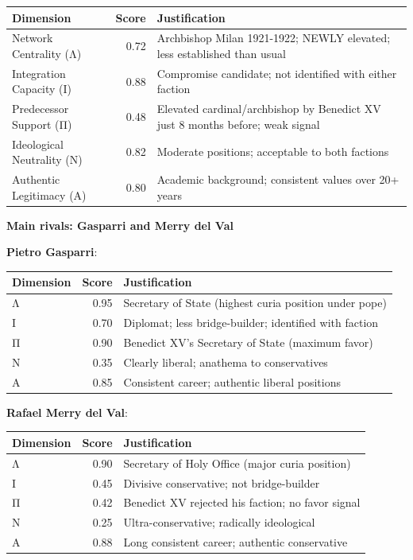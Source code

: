 \documentclass[11pt,a4paper]{article}
\begin{document}
\begin{center}
\begin{tabular}{lrp{4cm}}
\toprule
\textbf{Dimension} & \textbf{Score} & \textbf{Justification} \\
\midrule
Network Centrality (Λ) & 0.72 & Archbishop Milan 1921-1922; NEWLY elevated; less established than usual \\
Integration Capacity (Ι) & 0.88 & Compromise candidate; not identified with either faction \\
Predecessor Support (Π) & 0.48 & Elevated cardinal/archbishop by Benedict XV just 8 months before; weak signal \\
Ideological Neutrality (Ν) & 0.82 & Moderate positions; acceptable to both factions \\
Authentic Legitimacy (Α) & 0.80 & Academic background; consistent values over 20+ years \\
\bottomrule
\end{tabular}
\end{center}

\textbf{Main rivals: Gasparri and Merry del Val}

\textbf{Pietro Gasparri}:
\begin{center}
\begin{tabular}{lrp{4cm}}
\toprule
\textbf{Dimension} & \textbf{Score} & \textbf{Justification} \\
\midrule
Λ & 0.95 & Secretary of State (highest curia position under pope) \\
Ι & 0.70 & Diplomat; less bridge-builder; identified with faction \\
Π & 0.90 & Benedict XV's Secretary of State (maximum favor) \\
Ν & 0.35 & Clearly liberal; anathema to conservatives \\
Α & 0.85 & Consistent career; authentic liberal positions \\
\bottomrule
\end{tabular}
\end{center}

\textbf{Rafael Merry del Val}:
\begin{center}
\begin{tabular}{lrp{4cm}}
\toprule
\textbf{Dimension} & \textbf{Score} & \textbf{Justification} \\
\midrule
Λ & 0.90 & Secretary of Holy Office (major curia position) \\
Ι & 0.45 & Divisive conservative; not bridge-builder \\
Π & 0.42 & Benedict XV rejected his faction; no favor signal \\
Ν & 0.25 & Ultra-conservative; radically ideological \\
Α & 0.88 & Long consistent career; authentic conservative \\
\bottomrule
\end{tabular}
\end{center}
\end{document}
